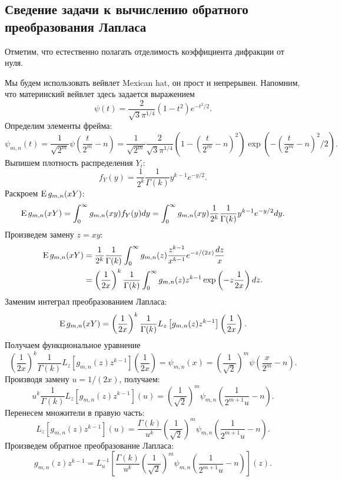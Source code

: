 \documentclass[../paper.tex]{subfiles}
\begin{document}
\subsection{Сведение задачи к вычислению обратного преобразования Лапласа}
Отметим, что естественно полагать отделимость коэффициента дифракции от нуля.

Мы будем использовать вейвлет Mexican hat, он прост и непрерывен. Напомним, что материнский вейвлет здесь задается выражением
\[
    \psi(t) = \frac{2}{\sqrt{3} \pi^{1 / 4}} (1-t^2)e^{-t^2 / 2}
.\]
Определим элементы фрейма:
\[
    \psi_{m,n}(t) = 
    \frac{1}{\sqrt{2^m}} \psi\left( \frac{t}{2^m}-n \right) =
    \frac{1}{\sqrt{2^m} }\frac{2}{\sqrt{3} \pi^{1 / 4}} \left(1-\left( \frac{t}{2^m} - n \right)^2 \right) \exp\left(-\left( \frac{t}{2^m} - n \right)^2 / 2\right)
.\]
Выпишем плотность распределения $Y_i$:
\[
	f_Y(y) = \frac{1}{2^k} \frac{1}{\Gamma(k)} y^{k-1} e^{-y / 2}
.\]
Раскроем $\operatorname{E} g_{m,n}(xY)$:
\[
	\operatorname{E} g_{m,n}(xY)
	= \int_0^\infty g_{m,n}(xy) f_Y(y) dy
	= \int_0^\infty g_{m,n}(xy) \frac{1}{2^k} \frac{1}{\Gamma(k)} y^{k-1} e^{-y / 2} dy
.\]
Произведем замену $z = xy$:
\begin{align*}
	\operatorname{E} g_{m,n}(xY)
	&= \frac{1}{2^k}\frac{1}{\Gamma(k)} \int_0^\infty g_{m,n}(z) \frac{z^{k-1}}{x^{k-1}} e^{-z/(2x)} \frac{dz}{x}
	\\&= \left(\frac{1}{2x}\right)^k \frac{1}{\Gamma(k)} \int_0^\infty g_{m,n}(z) z^{k-1} \exp\left(-z \frac{1}{2x}\right) dz
.\end{align*}
%
Заменим интеграл преобразованием Лапласа:
\[
	\operatorname{E} g_{m,n}(xY)
	= \left( \frac{1}{2x} \right)^k \frac{1}{\Gamma(k)} L_z \left[g_{m,n}(z) z^{k-1}\right] \left( \frac{1}{2x} \right)
.\]
%
Получаем функциональное уравнение
\[
	\left( \frac{1}{2x} \right)^k \frac{1}{\Gamma(k)} L_z \left[g_{m,n}(z) z^{k-1}\right] \left( \frac{1}{2x} \right)
	= \psi_{m,n}(x)
	= \left( \frac{1}{\sqrt{2} } \right)^m \psi \left( \frac{x}{2^m} - n \right) 
.\]
%
Производя замену $u = 1/(2x)$, получаем:
\[
    u^k \frac{1}{\Gamma(k)} L_z \left[g_{m,n}(z) z^{k-1}\right] \left( u \right)
    = \left( \frac{1}{\sqrt{2} } \right)^m \psi_{m,n} \left( \frac{1}{2^{m+1} u} - n \right) 
.\]
%
Перенесем множители в правую часть:
\[
    L_z \left[g_{m,n}(z) z^{k-1}\right] \left( u \right)
    = \frac{\Gamma(k)}{u^k} \left( \frac{1}{\sqrt{2} } \right)^m \psi_{m,n} \left( \frac{1}{2^{m+1} u} - n \right)
.\]
%
Произведем обратное преобразование Лапласа:
\[
    g_{m,n}(z) z^{k-1}
    = L^{-1}_u \left[ \frac{\Gamma(k)}{u^k} \left( \frac{1}{\sqrt{2} } \right)^m \psi_{m,n} \left( \frac{1}{2^{m+1} u} - n \right) \right] (z)
.\]
\end{document}

